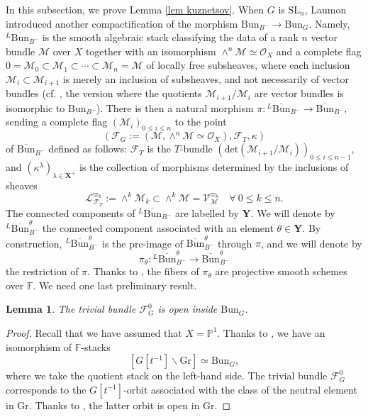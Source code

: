 \documentclass[11pt]{amsart}
\theoremstyle{plain}
\newtheorem{lem}[thm]{Lemma}
\theoremstyle{remark}
\numberwithin{equation}{section}
\begin{document}
	In this subsection, we prove Lemma \ref{lem kuznetsov}. When $G$ is $\mathrm{SL}_n$, Laumon introduced another compactification of the morphism $\mathrm{Bun}_{B^-}\to\mathrm{Bun}_G$. Namely, $^L\overline{\mathrm{Bun}}_{B^-}$ is the smooth algebraic stack classifying the data of a rank $n$ vector bundle $\mathcal{M}$ over $X$ together with an isomorphism $\wedge^n\mathcal{M}\simeq\mathcal{O}_X$ and a complete flag $0=\mathcal{M}_0\subset\mathcal{M}_1\subset\cdots\subset \mathcal{M}_n=\mathcal{M}$ of locally free subsheaves, where each inclusion $\mathcal{M}_i\subset\mathcal{M}_{i+1}$ is merely an inclusion of subsheaves, and not necessarily of vector bundles (cf. \cite[§3.3.1]{Lau}, the version where the quotients $\mathcal{M}_{i+1}/\mathcal{M}_i$ are vector bundles is isomorphic to $\mathrm{Bun}_{B^-}$). There is then a natural morphism $\pi:{^L\overline{\mathrm{Bun}}_{B^-}}\to \overline{\mathrm{Bun}}_{B^-}$, sending a complete flag $(\mathcal{M}_i)_{0\leq i\leq n}$ to the point 
 $$(\mathcal{F}_G:=(\mathcal{M},\wedge^n\mathcal{M}\simeq\mathcal{O}_X),\mathcal{F}_T,\kappa)$$ of $\overline{\mathrm{Bun}}_{B^-}$ defined as follows: $\mathcal{F}_T$ is the $T$-bundle $(\mathrm{det}(\mathcal{M}_{i+1}/\mathcal{M}_{i}))_{0\leq i\leq n-1}$, and $(\kappa^\lambda)_{\lambda\in\mathbf{X}^+}$ is the collection of morphisms determined by the inclusions of sheaves 
	$$\mathcal{L}^{\varpi_k}_{\mathcal{F}_T}:=\wedge^k\mathcal{M}_k\subset \wedge^k\mathcal{M}=\mathcal{V}^{\varpi_k}_\mathcal{M}\quad\forall~ 0\leq k\leq n.$$
	The connected components of $^L\overline{\mathrm{Bun}}_{B^-}$ are labelled by $\mathbf{Y}$. We will denote by $^L\overline{\mathrm{Bun}}_{B^-}^\theta$ the connected component associated with an element $\theta\in\mathbf{Y}$. By construction, $^L\overline{\mathrm{Bun}}_{B^-}^\theta$ is the pre-image of $\overline{\mathrm{Bun}}_{B^-}^\theta$ through $\pi$, and we will denote by 
	$$\pi_\theta:{^L\overline{\mathrm{Bun}}_{B^-}^\theta}\to \overline{\mathrm{Bun}}_{B^-}^\theta $$
	the restriction of $\pi$. Thanks to \cite[Lemme 4.2.3]{Lau}, the fibers of $\pi_\theta$ are projective smooth schemes over $\mathbb{F}$.  
 We need one last preliminary result.
 \begin{lem}\label{lem trivial open}
     The trivial bundle $\mathcal{F}^0_G$ is open inside $\mathrm{Bun}_G$.
 \end{lem}
 \begin{proof}
     Recall that we have assumed that $X=\mathbb{P}^1$. Thanks to \cite[Theorem 2.3.7]{zhu2016introduction}, we have an isomorphism of $\mathbb{F}$-stacks
     $$[G[t^{-1}]\backslash \mathrm{Gr}]\simeq \mathrm{Bun}_G, $$
     where we take the quotient stack on the left-hand side. The trivial bundle $\mathcal{F}^0_G$ corresponds to the $G[t^{-1}]$-orbit associated with the class of the neutral element in $\mathrm{Gr}$. Thanks to \cite[Proposition 2.3.3]{zhu2016introduction}, the latter orbit is open in $\mathrm{Gr}$.
 \end{proof}
\end{document}
